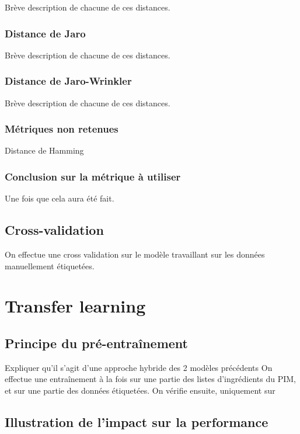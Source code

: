             Brève description de chacune de ces distances.
            
            \subsection{Distance de Jaro}
            Brève description de chacune de ces distances.

            \subsection{Distance de Jaro-Wrinkler}
            Brève description de chacune de ces distances.

            \subsection{Métriques non retenues}
            Distance de Hamming

            \subsection{Conclusion sur la métrique à utiliser}
            Une fois que cela aura été fait.


        \section{Cross-validation}
            
        On effectue une cross validation sur le modèle travaillant sur les données manuellement étiquetées.    
        
    \chapter{Transfer learning}
        
        \section{Principe du pré-entraînement}
        
        Expliquer qu'il s'agit d'une approche hybride des 2 modèles précédents
        On effectue une entraînement à la fois sur une partie des listes d'ingrédients du PIM, et sur une partie des données étiquetées.
        On vérifie ensuite, uniquement sur 

        \section{Illustration de l'impact sur la performance}

